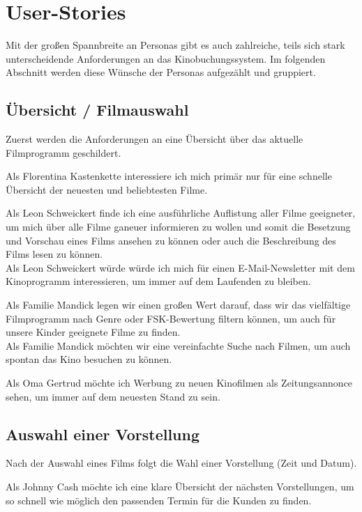 \section{User-Stories}
\multipleauthorsection{\authorGP}{\authorRF, \authorEJ}

Mit der großen Spannbreite an Personas gibt es auch zahlreiche, teils sich stark unterscheidende Anforderungen an das Kinobuchungssystem.
Im folgenden Abschnitt werden diese Wünsche der Personas aufgezählt und gruppiert.

\subsection{Übersicht / Filmauswahl}
Zuerst werden die Anforderungen an eine Übersicht über das aktuelle Filmprogramm geschildert.

Als Florentina Kastenkette interessiere ich mich primär nur für eine schnelle Übersicht der neuesten und beliebtesten Filme.

Als Leon Schweickert finde ich eine ausführliche Auflistung aller Filme geeigneter, um mich über alle Filme ganeuer informieren zu wollen und somit die Besetzung und Vorschau eines Films ansehen zu können oder auch die Beschreibung des Films lesen zu können.
\\
Als Leon Schweickert würde würde ich mich für einen E-Mail-Newsletter mit dem Kinoprogramm interessieren, um immer auf dem Laufenden zu bleiben.

Als Familie Mandick legen wir einen großen Wert darauf, dass wir das vielfältige Filmprogramm nach Genre oder \acs{FSK}-Bewertung filtern können, um auch für unsere Kinder geeignete Filme zu finden.
\\
Als Familie Mandick möchten wir eine vereinfachte Suche nach Filmen, um auch spontan das Kino besuchen zu können.

Als Oma Gertrud möchte ich Werbung zu neuen Kinofilmen als Zeitungsan­non­ce sehen, um immer auf dem neuesten Stand zu sein.

\subsection{Auswahl einer Vorstellung}
Nach der Auswahl eines Films folgt die Wahl einer Vorstellung (Zeit und Datum).

Als Johnny Cash möchte ich eine klare Übersicht der nächsten Vorstellungen, um so schnell wie möglich den passenden Termin für die Kunden zu finden.

